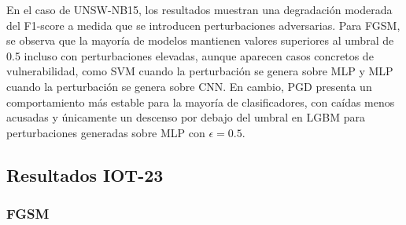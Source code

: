 En el caso de UNSW-NB15, los resultados muestran una degradación moderada del F1-score a medida que se introducen perturbaciones adversarias. Para FGSM, se observa que la mayoría de modelos mantienen valores superiores al umbral de 0.5 incluso con perturbaciones elevadas, aunque aparecen casos concretos de vulnerabilidad, como SVM cuando la perturbación se genera sobre MLP y MLP cuando la perturbación se genera sobre CNN. En cambio, PGD presenta un comportamiento más estable para la mayoría de clasificadores, con caídas menos acusadas y únicamente un descenso por debajo del umbral en LGBM para perturbaciones generadas sobre MLP con $\epsilon = 0.5$.

\subsection{Resultados IOT-23}

\subsubsection{FGSM}

\begin{table}[H]
\centering
\caption{F1-score de la clase ataque ante perturbaciones generadas sobre el modelo MLP}
\label{tab:f1_perturbacion_mlp_2}
\end{table}

